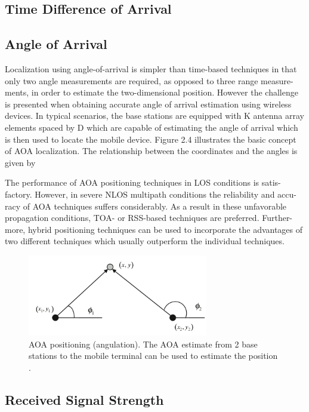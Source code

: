 \subsection{Time Difference of Arrival}

\subsection{Angle of Arrival}

Localization using angle-of-arrival is simpler than time-based techniques in that
only two angle measurements are required, as opposed to three range measure-
ments, in order to estimate the two-dimensional position. However the challenge is
presented when obtaining accurate angle of arrival estimation using wireless
devices. In typical scenarios, the base stations are equipped with K antenna array
elements spaced by D which are capable of estimating the angle of arrival which is
then used to locate the mobile device. Figure 2.4 illustrates the basic concept of AOA localization. The relationship between the coordinates and the angles is given by

The performance of AOA positioning techniques in LOS conditions is satis-
factory. However, in severe NLOS multipath conditions the reliability and accu-
racy of AOA techniques suffers considerably. As a result in these unfavorable
propagation conditions, TOA- or RSS-based techniques are preferred. Further-
more, hybrid positioning techniques can be used to incorporate the advantages of
two different techniques which usually outperform the individual techniques.


\begin{figure}[h]
\centering
\includegraphics[width=0.7\textwidth]{figures/angle_of_arrival.png}
\caption{AOA positioning (angulation). The AOA estimate from 2 base stations to the mobile terminal can be used to estimate the position \cite{GeoLoc}.}
\label{fig:2step}
\end{figure}


\subsection{Received Signal Strength}



